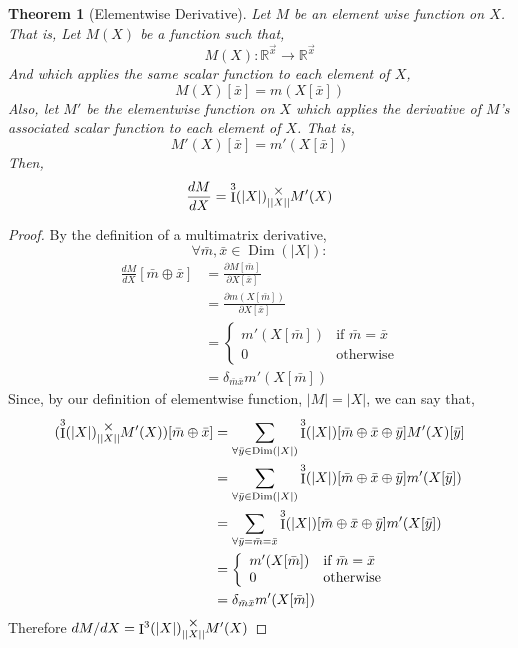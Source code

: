 \documentclass[12pt]{book}
\theoremstyle{plain}
\newtheorem{theorem}{Theorem}[chapter]
\theoremstyle{definition}
\theoremstyle{ppart}
\theoremstyle{case}
\theoremstyle{solution}
\DeclareMathOperator{\Dim}{Dim}
\DeclareMathOperator{\Ident}{I}
\newcommand{\mmult}[1]{\text{\raisebox{1ex}{$\underset{#1}{\times}$}}}
\newcommand{\shape}[1]{\left|#1\right|}
\begin{document}
\begin{theorem}[Elementwise Derivative]
\label{elementwise_derivative}
Let $M$ be an element wise function on $X$. That is, Let $M(X)$ be a function
such that,
\[ M(X) : \mathbb{R}^{\vec{x}} \to \mathbb{R}^{\vec{x}} \]
And which applies the same scalar function to each element of $X$, 
\[ M(X)[\bar{x}] = m(X[\bar{x}]) \]
Also, let $M'$ be the elementwise function on $X$ which applies the derivative
of $M$'s associated scalar function to each element of $X$. That is,
\[ M'(X)[\bar{x}] = m'(X[\bar{x}]) \]
Then,
\[ \frac{dM}{dX} = \Ident^3(\shape{X}) \mmult{\shape{\shape{X}}} M'(X) \]
\end{theorem}
\begin{proof}
By the definition of a multimatrix derivative,
\[ \forall \bar{m}, \bar{x} \in \Dim(\shape{X}) : \]
\begin{align*}
 \frac{dM}{dX}[\bar{m} \oplus \bar{x}]
 &= \frac{\partial M[\bar{m}]}{\partial X[\bar{x}]} \\
 &= \frac{\partial m(X[\bar{m}])}{\partial X[\bar{x}]} \\
 &= \left\{
  \begin{array}{ll}
    m'(X[\bar{m}]) & \mbox{if } \bar{m} = \bar{x} \\
    0 & \mbox{otherwise}
  \end{array}
 \right. \\
 &= \delta_{\bar{m} \bar{x}} m'(X[\bar{m}])
\end{align*}
Since, by our definition of elementwise function, $\shape{M} = \shape{X}$, we can
say that, 
\begin{align*}
 (\Ident^3(\shape{X}) \mmult{\shape{\shape{X}}} M'(X))[\bar{m} \oplus \bar{x}]
 &= \sum_{\forall \bar{y} \in \Dim(\shape{X})}
 \Ident^3(\shape{X})[\bar{m} \oplus \bar{x} \oplus \bar{y}] M'(X)[\bar{y}] \\
 &= \sum_{\forall \bar{y} \in \Dim(\shape{X})}
 \Ident^3(\shape{X})[\bar{m} \oplus \bar{x} \oplus \bar{y}] m'(X[\bar{y}]) \\
 &= \sum_{\forall \bar{y} = \bar{m} = \bar{x}}
 \Ident^3(\shape{X})[\bar{m} \oplus \bar{x} \oplus \bar{y}] m'(X[\bar{y}]) \\
 &= \left\{
  \begin{array}{ll}
    m'(X[\bar{m}]) & \mbox{if } \bar{m} = \bar{x} \\
    0 & \mbox{otherwise}
  \end{array}
 \right. \\
 &= \delta_{\bar{m} \bar{x}} m'(X[\bar{m}])
\end{align*}
Therefore $dM/dX = \Ident^3(\shape{X}) \mmult{\shape{\shape{X}}} M'(X)$
\end{proof}
\end{document}
